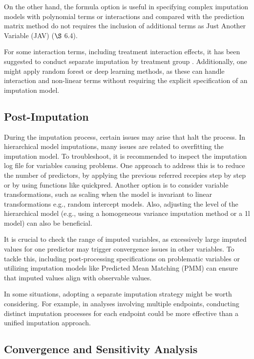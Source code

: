 \documentclass[
  article]{jss}
\begin{document}
On the other hand, the formula option is useful in specifying complex
imputation models with polynomial terms or interactions and compared
with the prediction matrix method do not requires the inclusion of
additional terms as Just Another Variable (JAV) \cite{buur18}(\(\S\)
6.4).

For some interaction terms, including treatment interaction effects, it
has been suggested to conduct separate imputation by treatment group
\cite{zhang2023}. Additionally, one might apply random forest or deep
learning methods, as these can handle interaction and non-linear terms
without requiring the explicit specification of an imputation model.

\hypertarget{post-imputation}{%
\subsection{Post-Imputation}\label{post-imputation}}

During the imputation process, certain issues may arise that halt the
process. In hierarchical model imputations, many issues are related to
overfitting the imputation model. To troubleshoot, it is recommended to
inspect the imputation log file for variables causing problems. One
approach to address this is to reduce the number of predictors, by
applying the previous referred recepies step by step or by using
functions like quickpred. Another option is to consider variable
transformations, such as scaling when the model is invariant to linear
transformations e.g., random intercept models. Also, adjusting the level
of the hierarchical model (e.g., using a homogeneous variance imputation
method or a 1l model) can also be beneficial.

It is crucial to check the range of imputed variables, as excessively
large imputed values for one predictor may trigger convergence issues in
other variables. To tackle this, including post-processing
specifications on problematic variables or utilizing imputation models
like Predicted Mean Matching (PMM) can ensure that imputed values align
with observable values.

In some situations, adopting a separate imputation strategy might be
worth considering. For example, in analyses involving multiple
endpoints, conducting distinct imputation processes for each endpoint
could be more effective than a unified imputation approach.

\hypertarget{convergence-and-sensitivity-analysis}{%
\subsection{Convergence and Sensitivity
Analysis}\label{convergence-and-sensitivity-analysis}}
\end{document}
